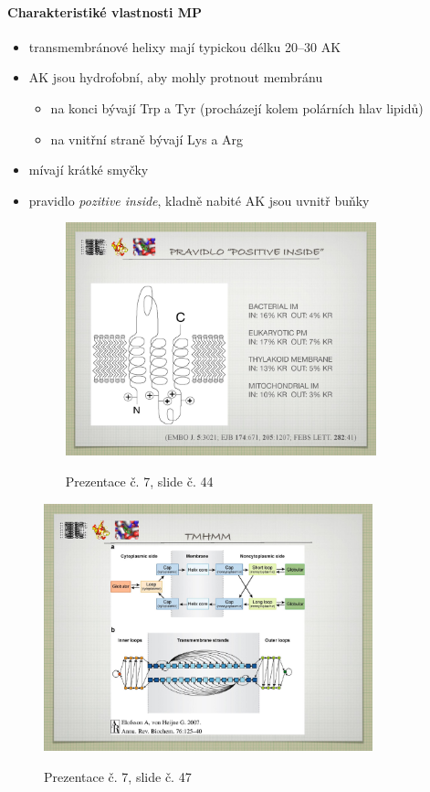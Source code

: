 \documentclass[DIV=8]{scrreprt}
\begin{document}
\paragraph{Charakteristiké vlastnosti MP}
\begin{itemize}[nosep]
    \item transmembránové helixy mají typickou délku 20--30 AK
    \item AK jsou hydrofobní, aby mohly protnout membránu
\begin{itemize}[nosep]
    \item na konci bývají Trp a Tyr (procházejí kolem polárních hlav lipidů)
    \item na vnitřní straně bývají Lys a Arg
\end{itemize}

    \item mívají krátké smyčky
    \item pravidlo \emph{pozitive inside}, kladně nabité AK jsou uvnitř buňky \begin{figure}
    \caption{Prezentace č. 7, slide č. 44}
    \includegraphics[width=0.85\textwidth]{slides-7/slide-44.jpg}
    \centering
    \label{slides-7-slide-44}
\end{figure}

\end{itemize}



\begin{figure}
    \caption{Prezentace č. 7, slide č. 47}
    \includegraphics[width=0.85\textwidth]{slides-7/slide-47.jpg}
    \centering
    \label{slides-7-slide-47}
\end{figure}
\end{document}
